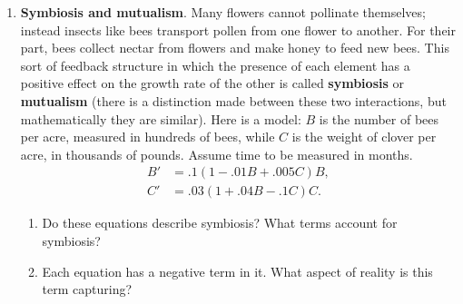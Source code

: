 \begin{enumerate}
\begin{enumerate}
  \item The Leslie--Gower model.
\begin{align*}
R' &= aR-bRF, \\
F' &= \left( e - f \dfrac{F}{R}\right) F.
\end{align*}



  \item Leslie--Gower with carrying capacity for rabbits.
\begin{align*}
R' &= aR\left( 1- \dfrac{R}{K}\right) - b RF, \\
F' &= \left( e - f \dfrac{F}{R}\right) F.
\end{align*}


  \item Another combination.
\begin{align*}
R' &= aR\left( 1- \dfrac{R}{K}\right) - b RF, \\
F' &= cRF+gF-hF^2.
\end{align*}

\enlargethispage*{5pt}

\end{enumerate}
\item {\bf Symbiosis and mutualism}.
Many flowers cannot pollinate themselves; instead insects like bees
transport pollen from one flower to another.  For their part, bees
collect nectar from flowers and make honey to feed new bees.  This
sort of feedback structure in which the presence of each element has a
positive effect on the growth rate of the other is called {\bf
  symbiosis} or {\bf mutualism} (there is a distinction made between
these two interactions, but mathematically they are similar).  Here is
a model: $B$ is the number of bees per acre, measured in hundreds of
bees, while $C$ is the weight of clover per acre, in thousands of
pounds.  Assume time to be measured in months.
\begin{align*}
B' & = .1(1 - .01B + .005C) B, \\
C' & = .03(1 + .04B - .1C) C.
\end{align*}


  \begin{enumerate}
  \item Do these equations describe symbiosis?  What terms account for
symbiosis?

  \item Each equation has a negative term in it.  What aspect of reality
is this term capturing?


\end{enumerate}
\end{enumerate}
